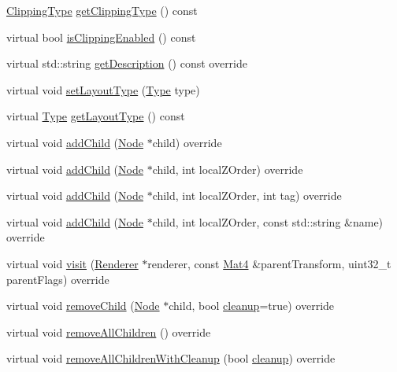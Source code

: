 \begin{DoxyCompactItemize}
\hyperlink{classui_1_1Layout_acd2a398e83d7d467e9565d4db171c865}{Clipping\+Type} \hyperlink{classui_1_1Layout_ab348b089c976c90499df4309a0b51624}{get\+Clipping\+Type} () const
\item 
virtual bool \hyperlink{classui_1_1Layout_a7a0a9ff2d476cbf3067e737c6ec3e18f}{is\+Clipping\+Enabled} () const
\item 
virtual std\+::string \hyperlink{classui_1_1Layout_a3fdf14a50462dff31ec875b28e223c7f}{get\+Description} () const override
\item 
virtual void \hyperlink{classui_1_1Layout_a79c8c32f381022f2da2984b6f03d711c}{set\+Layout\+Type} (\hyperlink{classui_1_1Layout_aecabbc1592677eadd6757edc1df5b952}{Type} type)
\item 
virtual \hyperlink{classui_1_1Layout_aecabbc1592677eadd6757edc1df5b952}{Type} \hyperlink{classui_1_1Layout_a4eaf95d303163cfd1064575625c95b33}{get\+Layout\+Type} () const
\item 
virtual void \hyperlink{classui_1_1Layout_a5d22ede0db71db1d5b597207f1c2013e}{add\+Child} (\hyperlink{classNode}{Node} $\ast$child) override
\item 
virtual void \hyperlink{classui_1_1Layout_a0ba6f93abe0d74d31d08147339952e19}{add\+Child} (\hyperlink{classNode}{Node} $\ast$child, int local\+Z\+Order) override
\item 
virtual void \hyperlink{classui_1_1Layout_a26b16c7813db3140be62bad81c20a1f1}{add\+Child} (\hyperlink{classNode}{Node} $\ast$child, int local\+Z\+Order, int tag) override
\item 
virtual void \hyperlink{classui_1_1Layout_a76de7bb6c904e26b59aa67cff99feed1}{add\+Child} (\hyperlink{classNode}{Node} $\ast$child, int local\+Z\+Order, const std\+::string \&name) override
\item 
virtual void \hyperlink{classui_1_1Layout_a46a4f4f4836e1b9c985acb26f8fa4163}{visit} (\hyperlink{classRenderer}{Renderer} $\ast$renderer, const \hyperlink{classMat4}{Mat4} \&parent\+Transform, uint32\+\_\+t parent\+Flags) override
\item 
virtual void \hyperlink{classui_1_1Layout_a13d675c669b6b926956baf484ce0857a}{remove\+Child} (\hyperlink{classNode}{Node} $\ast$child, bool \hyperlink{classProtectedNode_a5462a6202b458193c1881bcdcc5be78d}{cleanup}=true) override
\item 
virtual void \hyperlink{classui_1_1Layout_a6b40fa4ad7a14a1eece297e466e2c86e}{remove\+All\+Children} () override
\item 
virtual void \hyperlink{classui_1_1Layout_a7c317fa2fc294158776962b9218304b9}{remove\+All\+Children\+With\+Cleanup} (bool \hyperlink{classProtectedNode_a5462a6202b458193c1881bcdcc5be78d}{cleanup}) override

\end{DoxyCompactItemize}
